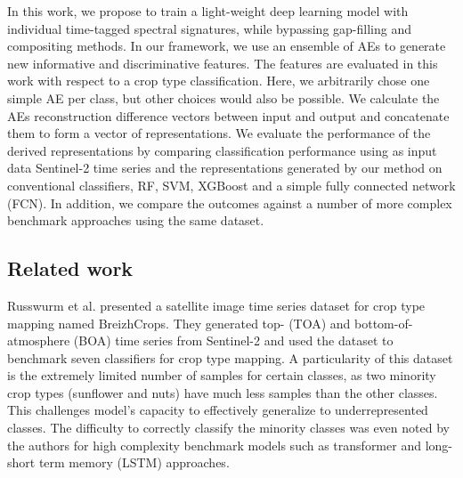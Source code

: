 \documentclass[journal,article,submit,pdftex,moreauthors]{Definitions/mdpi}
\begin{document}

In this work, we propose to train a light-weight deep learning model with individual time-tagged spectral signatures, while bypassing gap-filling and compositing methods.
In our framework, we use an ensemble of \ac{AEs} to generate new informative and discriminative features. The features are evaluated in this work with respect to a crop type classification. 
Here, we arbitrarily chose one simple AE per class, but other choices would also be possible.
We calculate the \ac{AEs} reconstruction difference vectors between input and output and concatenate them to form a vector of representations. 
We evaluate the performance of the derived representations by comparing classification performance using as input data Sentinel-2 time series and the representations generated by our method on conventional classifiers, RF, SVM, XGBoost and a simple fully connected network (FCN). In addition, we compare the outcomes against a number of more complex benchmark approaches using the same dataset.

\subsection{Related work}\label{sec:related_work}
Russwurm et al. \cite{Russwurm2020} presented a satellite image time series dataset for crop type mapping named BreizhCrops. They generated top- (TOA) and bottom-of-atmosphere (BOA) time series from Sentinel-2 and used the dataset to benchmark seven classifiers for crop type mapping. A particularity of this dataset is the extremely limited number of samples for certain classes, as two minority crop types (sunflower and nuts) have much less samples than the other classes. This challenges model's capacity to effectively generalize to underrepresented classes. The difficulty to correctly classify the minority classes was even noted by the authors for high complexity benchmark models such as transformer and long-short term memory (LSTM) approaches.
\end{document}
